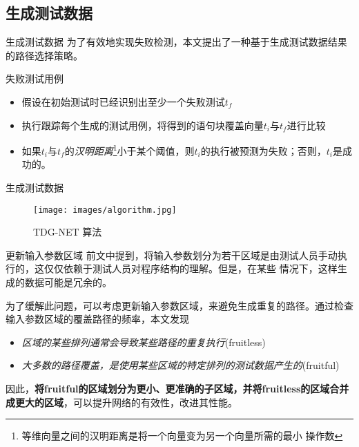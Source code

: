 \documentclass{beamer}
\begin{document}
    \subsection{生成测试数据}

    \begin{frame}{生成测试数据}
        为了有效地实现失败检测，本文提出了一种基于生成测试数据结果的路径选择策略。
        \begin{block}{失败测试用例}
            \begin{itemize}
                \item 假设在初始测试时已经识别出至少一个失败测试$t_f$
                \item 执行跟踪每个生成的测试用例，将得到的语句块覆盖向量$t_i$与$t_f$进行比较
                \item 如果$t_i$与$t_f$的\textit{汉明距离}\footnote{等维向量之间的汉明距离是将一个向量变为另一个向量所需的最小
                操作数}小于某个阈值，则$t_i$的执行被预测为失败；否则，$t_i$是成功的。
            \end{itemize}
        \end{block}
    \end{frame}

    \begin{frame}{生成测试数据}
        \begin{figure}[!ht]
            \centering
            \texttt{[image: images/algorithm.jpg]}
            \caption{TDG-NET 算法}
            \label{fig:algorithm}
        \end{figure}
    \end{frame}

    \begin{frame}{更新输入参数区域}
        \hspace{2em} 前文中提到，将输入参数划分为若干区域是由测试人员手动执行的，这仅仅依赖于测试人员对程序结构的理解。但是，在某些
        情况下，这样生成的数据可能是冗余的。

        \hspace{2em} 为了缓解此问题，可以考虑更新输入参数区域，来避免生成重复的路径。通过检查输入参数区域的覆盖路径的频率，本文发现
        
        \begin{block}{}
            \begin{itemize}
                \item \textit{区域的某些排列通常会导致某些路径的重复执行}(fruitless)
                \item \textit{大多数的路径覆盖，是使用某些区域的特定排列的测试数据产生的}(fruitful)
            \end{itemize}
        \end{block}

        \hspace{2em} 因此，\textbf{将fruitful的区域划分为更小、更准确的子区域，并将fruitless的区域合并成更大的区域}，可以提升网络的有效性，改进其性能。
    \end{frame}
\end{document}
